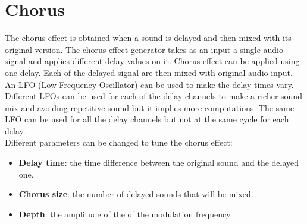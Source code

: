 \section{Chorus}

The chorus effect is obtained when a sound is delayed and then mixed with its original version. 
The chorus effect generator takes as an input a single audio signal and applies different delay values on it. Chorus effect can be applied using one delay. Each of the delayed signal are then mixed with original audio input. 
An LFO (Low Frequency Oscillator) can be used to make the delay times vary. Different LFOs can be used for each of the delay channels to make a richer sound mix and avoiding repetitive sound but it implies more computations. The same LFO can be used for all the delay channels but not at the same cycle for each delay. \\

Different parameters can be changed to tune the chorus effect:\\
\begin{itemize}
\item \textbf{Delay time}: the time difference between the original sound and the delayed one.
\item \textbf{Chorus size}: the number of delayed sounds that will be mixed.
\item \textbf{Depth}: the amplitude of the of the modulation frequency.
\end{itemize}

